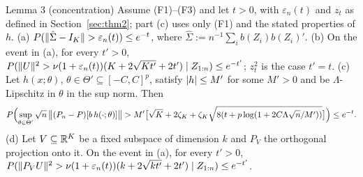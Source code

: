 \begin{result}[Lemma3]{Lemma 3 (concentration)}
Assume (F1)--(F3) and let $t > 0$, with $\varepsilon_n(t)$ and $z_t$ as defined in Section~\ref{sec:thm2}; part (c) uses only (F1) and the stated properties of $h$.
(a) $P(\lVert \hat\Sigma - I_K\rVert > \varepsilon_n(t)) \le e^{-t}$, where $\hat\Sigma := n^{-1}\sum_ib(Z_i)b(Z_i)'$.
(b) On the event in (a), for every $t' > 0$, $P(\lVert U\rVert^2 > \nu(1 + \varepsilon_n(t))(K + 2\sqrt{Kt'} + 2t') \mid Z_{1:n}) \le e^{-t'}$; $z_t^2$ is the case $t' = t$.
(c) Let $h(x;\theta)$, $\theta \in \Theta' \subseteq [-C, C]^p$, satisfy $\lvert h\rvert \le M'$ for some $M' > 0$ and be $\Lambda$-Lipschitz in $\theta$ in the sup norm. Then
\[
P\Bigl(\sup_{\theta \in \Theta'}\sqrt n\,\bigl\lVert (P_n - P)[b\,h(\cdot;\theta)]\bigr\rVert > M'\bigl[\sqrt K + 2\zeta_K + \zeta_K\sqrt{8(t + p\log(1 + 2C\Lambda\sqrt n/M'))}\bigr]\Bigr) \le e^{-t}.
\]
(d) Let $V \subseteq \mathbb{R}^K$ be a fixed subspace of dimension $k$ and $P_V$ the orthogonal projection onto it. On the event in (a), for every $t' > 0$, $P(\lVert P_VU\rVert^2 > \nu(1 + \varepsilon_n(t))(k + 2\sqrt{kt'} + 2t') \mid Z_{1:n}) \le e^{-t'}$.
\end{result}

